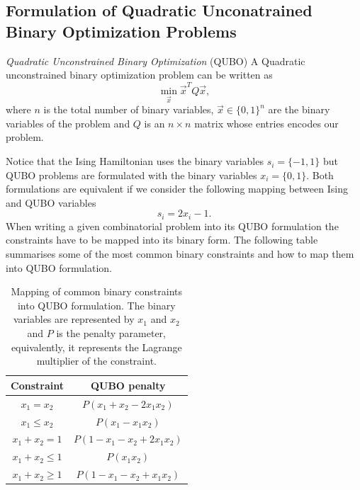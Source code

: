 \subsection{Formulation of Quadratic Unconatrained Binary Optimization Problems}
\begin{definition}{\textit{Quadratic Unconstrained Binary Optimization} (QUBO)}
   A Quadratic unconstrained binary optimization problem can be written as
\begin{equation}
    \min_{\vec{x}}\vec{x}^{T}Q\vec{x},
\end{equation}
where $n$ is the total number of binary variables, $\vec{x}\in\{0,1\}^{n}$ are the binary variables of the problem and $Q$ is an $n\times n$ matrix whose entries encodes our problem.
\end{definition}
Notice that the Ising Hamiltonian uses the binary variables $s_{i} = \{-1,1\}$ but QUBO problems are formulated with the binary variables $x_{i} = \{0,1\}$. Both formulations are equivalent if we consider the following mapping between Ising and QUBO variables
\begin{equation}
\label{eq: ISING_QUBO}
    s_{i} = 2x_{i} - 1.
\end{equation}
When writing a given combinatorial problem into its QUBO formulation the constraints have to be mapped into its binary form. The following table summarises some of the most common binary constraints and how to map them into QUBO formulation.
\begin{table}[H]
\centering
\begin{tabular}{ |c|c| }
 \hline
 \textbf{Constraint} & \textbf{QUBO penalty} \\
 \hline
 $x_{1}=x_{2}$ & $P\left(x_{1} + x_{2} -2x_{1}x_{2}\right)$  \\
 \hline
 $x_{1}\leq x_{2}$ &  $P\left(x_{1} -x_{1}x_{2}\right)$   \\
 \hline
 $x_{1} + x_{2} = 1$ & $P\left(1-x_{1}-x_{2}+2x_{1}x_{2}\right)$ \\
 \hline
 $x_{1} + x_{2} \leq 1$    & $P\left(x_{1}x_{2}\right)$ \\
 \hline
$x_{1} + x_{2} \geq 1$ &   $P\left(1-x_{1}-x_{2}+x_{1}x_{2}\right)$ \\
 \hline
\end{tabular}
\caption{Mapping of common binary constraints into QUBO formulation. The binary variables are represented by $x_{1}$ and $x_{2}$ and $P$ is the penalty parameter, equivalently, it represents the Lagrange multiplier of the constraint.}
\end{table}
